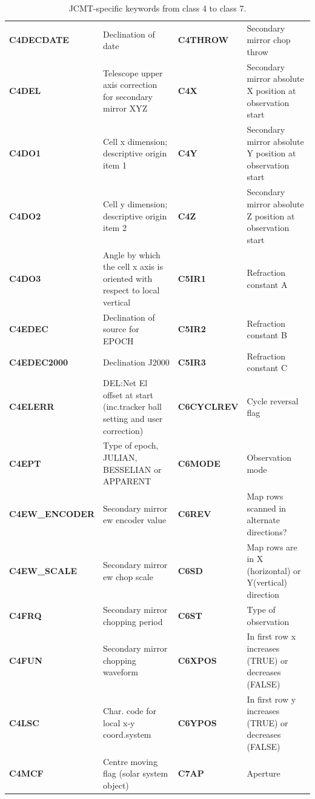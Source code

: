 \documentclass[final,authoryear,5p,times,twocolumn]{elsarticle}
\begin{document}
\begin{table}[t]
\caption{JCMT-specific keywords from class 4 to class 7.}
\label{tab:appa2}
\begin{center}
\begin{tabular}{|lp{2.0in}|lp{2.0in}|}
\hline
\textbf{C4DECDATE} & Declination of date & \textbf{C4THROW} & Secondary mirror chop throw\\
\textbf{C4DEL} & Telescope upper axis correction for secondary mirror XYZ & \textbf{C4X} & Secondary mirror absolute X position at observation start\\
\textbf{C4DO1} & Cell x dimension; descriptive origin item 1 & \textbf{C4Y} & Secondary mirror absolute Y position at observation start\\
\textbf{C4DO2} & Cell y dimension; descriptive origin item 2 & \textbf{C4Z} & Secondary mirror absolute Z position at observation start\\
\textbf{C4DO3} & Angle by which the cell x axis is oriented with respect to local vertical & \textbf{C5IR1} & Refraction constant A\\
\textbf{C4EDEC} & Declination of source for EPOCH & \textbf{C5IR2} & Refraction constant B\\
\textbf{C4EDEC2000} & Declination J2000 & \textbf{C5IR3} & Refraction constant C\\
\textbf{C4ELERR} & DEL:Net El offset at start (inc.tracker ball setting and user correction) & \textbf{C6CYCLREV} & Cycle reversal flag\\
\textbf{C4EPT} & Type of epoch, JULIAN, BESSELIAN or APPARENT & \textbf{C6MODE} & Observation mode\\
\textbf{C4EW\_ENCODER} & Secondary mirror ew encoder value & \textbf{C6REV} & Map rows scanned in alternate directions?\\
\textbf{C4EW\_SCALE} & Secondary mirror ew chop scale & \textbf{C6SD} & Map rows are in X (horizontal) or Y(vertical) direction\\
\textbf{C4FRQ} & Secondary mirror chopping period & \textbf{C6ST} & Type of observation\\
\textbf{C4FUN} & Secondary mirror chopping waveform & \textbf{C6XPOS} & In first row x increases (TRUE) or decreases (FALSE)\\
\textbf{C4LSC} & Char. code for local x-y coord.system & \textbf{C6YPOS} & In first row y increases (TRUE) or decreases (FALSE)\\
\textbf{C4MCF} & Centre moving flag (solar system object) & \textbf{C7AP} & Aperture\\

\end{tabular}
\end{center}
\end{table}
\end{document}
